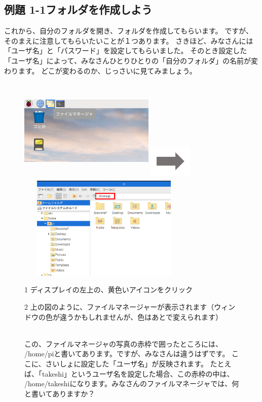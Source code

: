 \documentclass[a4paper,12pt]{jarticle}
\begin{document}
\clearpage

\subsection{例題 1-1フォルダを作成しよう}
これから、自分のフォルダを開き、フォルダを作成してもらいます。
ですが、そのまえに注意してもらいたいことが１つあります。
さきほど、みなさんには「ユーザ名」と「パスワード」を設定してもらいました。
そのとき設定した「ユーザ名」によって、みなさんひとりひとりの「自分のフォルダ」の名前が変わります。
どこが変わるのか、じっさいに見てみましょう。

\begin{figure}[ht]
\begin{minipage}{\textwidth}
  \includegraphics[width=6.472cm,height=4.976cm]{textbook-img032.png}
  \includegraphics[width=2.094cm,height=1.771cm]{textbook-img035.png}
  \includegraphics[width=8.301cm,height=4.948cm]{textbook-img1020.png}
\end{minipage}
\begin{minipage}{0.4\textwidth}
  1
  ディスプレイの左上の、黄色いアイコンをクリック
\end{minipage}
\vspace{20pt}
\hfill
\begin{minipage}{0.4\textwidth}
  2
  上の図のように、ファイルマネージャーが表示されます（ウィンドウの色が違うかもしれませんが、色はあとで変えられます）
\end{minipage}\\
この、ファイルマネージャの写真の赤枠で囲ったところには、
/home/piと書いてあります。ですが、みなさんは違うはずです。
ここに、さいしょに設定した「ユーザ名」が反映されます。
たとえば、「takeshi」というユーザ名を設定した場合、この赤枠の中は、
/home/takeshiになります。みなさんのファイルマネージャでは、何と書いてありますか？\\
\vspace{20pt}


\end{figure}
\end{document}
